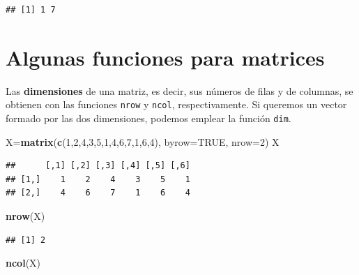 \documentclass[]{book}
\newenvironment{Shaded}{\begin{snugshade}}{\end{snugshade}}
\newcommand{\DataTypeTok}[1]{\textcolor[rgb]{0.13,0.29,0.53}{#1}}
\newcommand{\DecValTok}[1]{\textcolor[rgb]{0.00,0.00,0.81}{#1}}
\newcommand{\KeywordTok}[1]{\textcolor[rgb]{0.13,0.29,0.53}{\textbf{#1}}}
\newcommand{\NormalTok}[1]{#1}
\newcommand{\OtherTok}[1]{\textcolor[rgb]{0.56,0.35,0.01}{#1}}
\theoremstyle{definition}
\theoremstyle{definition}
\theoremstyle{definition}
\theoremstyle{remark}
\begin{document}
\begin{verbatim}
## [1] 1 7
\end{verbatim}

\hypertarget{algunas-funciones-para-matrices}{%
\section{Algunas funciones para matrices}\label{algunas-funciones-para-matrices}}

Las \textbf{dimensiones} de una matriz, es decir, sus números de filas y de columnas, se obtienen con las funciones \texttt{nrow} y \texttt{ncol}, respectivamente. Si queremos un vector formado por las dos dimensiones, podemos emplear la función \texttt{dim}.

\begin{Shaded}
\begin{Highlighting}[]
\NormalTok{X=}\KeywordTok{matrix}\NormalTok{(}\KeywordTok{c}\NormalTok{(}\DecValTok{1}\NormalTok{,}\DecValTok{2}\NormalTok{,}\DecValTok{4}\NormalTok{,}\DecValTok{3}\NormalTok{,}\DecValTok{5}\NormalTok{,}\DecValTok{1}\NormalTok{,}\DecValTok{4}\NormalTok{,}\DecValTok{6}\NormalTok{,}\DecValTok{7}\NormalTok{,}\DecValTok{1}\NormalTok{,}\DecValTok{6}\NormalTok{,}\DecValTok{4}\NormalTok{), }\DataTypeTok{byrow=}\OtherTok{TRUE}\NormalTok{, }\DataTypeTok{nrow=}\DecValTok{2}\NormalTok{)}
\NormalTok{X}
\end{Highlighting}
\end{Shaded}

\begin{verbatim}
##      [,1] [,2] [,3] [,4] [,5] [,6]
## [1,]    1    2    4    3    5    1
## [2,]    4    6    7    1    6    4
\end{verbatim}

\begin{Shaded}
\begin{Highlighting}[]
\KeywordTok{nrow}\NormalTok{(X)}
\end{Highlighting}
\end{Shaded}

\begin{verbatim}
## [1] 2
\end{verbatim}

\begin{Shaded}
\begin{Highlighting}[]
\KeywordTok{ncol}\NormalTok{(X)}
\end{Highlighting}
\end{Shaded}
\end{document}
